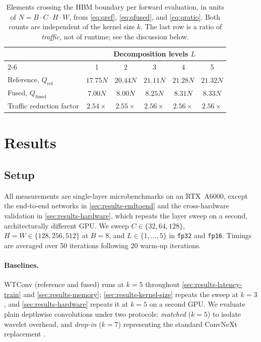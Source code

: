 \documentclass[10pt]{article} %
\newcommand{\Qio}{Q}                    %
\theoremstyle{plain}
\begin{document}
\begin{table}[h]
\centering
\caption{Elements crossing the HBM boundary per forward evaluation, in units of $N=B\cdot C\cdot H\cdot W$, from \autoref{eq:qref}, \autoref{eq:qfused}, and \autoref{eq:qratio}. Both counts are independent of the kernel size $k$. The last row is a ratio of \emph{traffic}, not of runtime; see the discussion below.}
\label{tab:traffic}
\begin{tabular}{lccccc}
\toprule
& \multicolumn{5}{c}{Decomposition levels $L$}\\
\cmidrule(lr){2-6}
 & 1 & 2 & 3 & 4 & 5 \\
\midrule
Reference, $\Qio_{\mathrm{ref}}$ & $17.75N$ & $20.44N$ & $21.11N$ & $21.28N$ & $21.32N$ \\
Fused, $\Qio_{\mathrm{fused}}$   & $7.00N$  & $8.00N$  & $8.25N$  & $8.31N$  & $8.33N$ \\
\addlinespace[2pt]
Traffic reduction factor & $2.54\times$ & $2.55\times$ & $2.56\times$ & $2.56\times$ & $2.56\times$ \\
\bottomrule
\end{tabular}
\end{table}


\section{Results}
\label{sec:results}

\subsection{Setup}
\label{sec:setup}

All measurements are single-layer microbenchmarks on an RTX~A6000, except the end-to-end networks in \autoref{sec:results-endtoend} and the cross-hardware validation in \autoref{sec:results-hardware}, which repeats the layer sweep on a second, architecturally different GPU. We sweep $C\in\{32,64,128\}$, $H=W\in\{128,256,512\}$ at $B{=}8$, and $L\in\{1,\dots,5\}$ in \texttt{fp32} and \texttt{fp16}. Timings are averaged over 50 iterations following 20 warm-up iterations.

\paragraph{Baselines.} WTConv (reference and fused) runs at $k{=}5$ throughout
\autoref{sec:results-latency-train} and \autoref{sec:results-memory}; \autoref{sec:results-kernel-size} repeats the sweep at $k{=}3$, and \autoref{sec:results-hardware} repeats it at $k{=}5$ on a second GPU. We evaluate plain depthwise convolutions under two protocols: \emph{matched} ($k{=}5$) to isolate wavelet overhead, and \emph{drop-in} ($k{=}7$) representing the standard ConvNeXt replacement \citep{liu2022convnext}.
\end{document}
